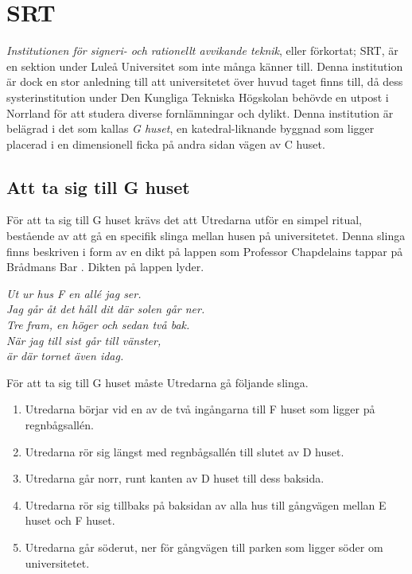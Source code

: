 \section{SRT}
\label{loc:SRT}
\textit{Institutionen för signeri- och rationellt avvikande teknik}, eller förkortat; SRT, är en sektion under Luleå Universitet som inte många känner till. Denna institution är dock en stor anledning till att universitetet över huvud taget finns till, då dess systerinstitution under Den Kungliga Tekniska Högskolan behövde en utpost i Norrland för att studera diverse fornlämningar och dylikt. Denna institution är belägrad i det som kallas \textit{G huset}, en katedral-liknande byggnad som ligger placerad i en dimensionell ficka på andra sidan vägen av C huset.
%
\subsection{Att ta sig till G huset}
\label{uppd:TaSigTillG}
För att ta sig till G huset krävs det att Utredarna utför en simpel ritual, bestående av att gå en specifik slinga mellan husen på universitetet. Denna slinga finns beskriven i form av en dikt på lappen som Professor Chapdelains tappar på Brådmans Bar \sectiondescribe{\ref{loc:BradmansBar}}. Dikten på lappen lyder.
%
\begin{displayquote}
\begin{center}
	\textit{Ut ur hus F en allé jag ser. \\
	Jag går åt det håll dit där solen går ner. \\
	\vspace*{10px}
	Tre fram, en höger och sedan två bak. \\
	När jag till sist går till vänster, \\
	är där tornet även idag.}
\end{center}
\end{displayquote}
%
För att ta sig till G huset måste Utredarna gå följande slinga.
%
\begin{enumerate}
	\item Utredarna börjar vid en av de två ingångarna till F huset som ligger på regnbågsallén.
	\item Utredarna rör sig längst med regnbågsallén till slutet av D huset.
	\item Utredarna går norr, runt kanten av D huset till dess baksida.
	\item Utredarna rör sig tillbaks på baksidan av alla hus till gångvägen mellan E huset och F huset.
	\item Utredarna går söderut, ner för gångvägen till parken som ligger söder om universitetet. 
\end{enumerate}
